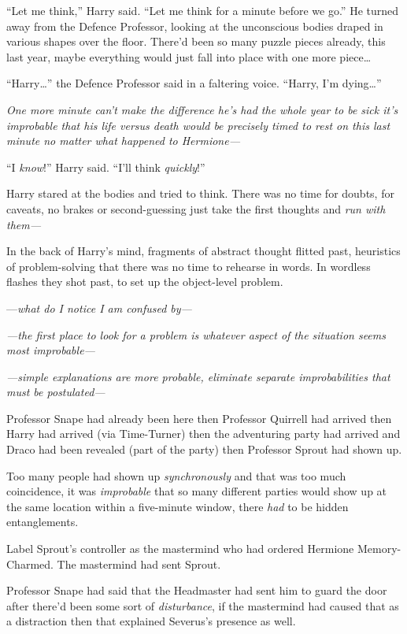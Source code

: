 “Let me think,” Harry said. “Let me think for a minute before we go.” He turned away from the Defence Professor, looking at the unconscious bodies draped in various shapes over the floor. There’d been so many puzzle pieces already, this last year, maybe everything would just fall into place with one more piece…

“Harry…” the Defence Professor said in a faltering voice. “Harry, I’m dying…”

\emph{One more minute can’t make the difference he’s had the \emph{whole year} to be sick it’s \emph{improbable} that his life versus death would be precisely timed to rest on this last minute no matter what happened to Hermione—}

“I \emph{know}!” Harry said. “I’ll think \emph{quickly}!”

Harry stared at the bodies and tried to think. There was no time for doubts, for caveats, no brakes or second-guessing just take the first thoughts and \emph{run with them—}

In the back of Harry’s mind, fragments of abstract thought flitted past, heuristics of problem-solving that there was no time to rehearse in words. In wordless flashes they shot past, to set up the object-level problem.

—\emph{what do I notice I am confused by—}

\emph{—the first place to look for a problem is whatever aspect of the situation seems most improbable—}

\emph{—simple explanations are more probable, eliminate separate improbabilities that must be postulated—}

Professor Snape had already been here then Professor Quirrell had arrived then Harry had arrived (via Time-Turner) then the adventuring party had arrived and Draco had been revealed (part of the party) then Professor Sprout had shown up.

Too many people had shown up \emph{synchronously} and that was too much coincidence, it was \emph{improbable} that so many different parties would show up at the same location within a five-minute window, there \emph{had} to be hidden entanglements.

Label Sprout’s controller as the mastermind who had ordered Hermione Memory-Charmed. The mastermind had sent Sprout.

Professor Snape had said that the Headmaster had sent him to guard the door after there’d been some sort of \emph{disturbance}, if the mastermind had caused that as a distraction then that explained Severus’s presence as well.

